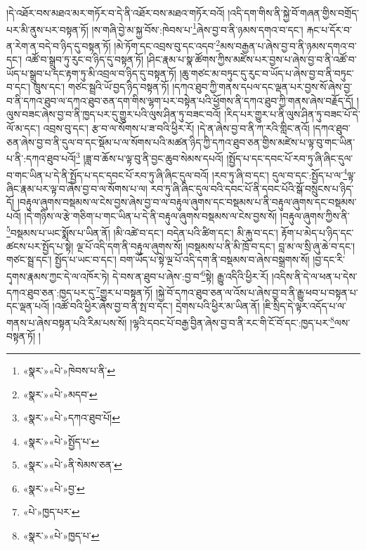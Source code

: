 །དེ་འཐོར་བས་མཐའ་མར་གཏོར་བ་དེ་ནི་འཐོར་བས་མཐའ་གཏོར་བའོ། །འདི་དག་གིས་ནི་སྐྱེ་བོ་གཞན་གྱིས་བགྲོད་པར་མི་ནུས་པར་བསྟན་ཏོ། །ས་གཞི་བྱེ་མ་སྐྱ་བོས་:ཁེབས་པ་\footnote{«སྣར་»«པེ་»ཁེབས་པ་ནི་}ཞེས་བྱ་བ་ནི་ཉམས་དགའ་བ་དང་། རྐང་པ་དོར་བ་ན་རེག་ན་བདེ་བ་ཉིད་དུ་བསྟན་ཏོ། །མེ་ཏོག་དང་འབྲས་བུ་དང་འདབ་\footnote{«སྣར་»«པེ་»མདབ་}མས་བརྒྱན་པ་ཞེས་བྱ་བ་ནི་ཉམས་དགའ་བ་དང་། འཚོ་བ་སྒྲུབ་ཏུ་རུང་བ་ཉིད་དུ་བསྟན་ཏོ། །ཤིང་རྣམ་པ་སྣ་ཚོགས་ཀྱིས་མཛེས་པར་བྱས་པ་ཞེས་བྱ་བ་ནི་འཚོ་བ་ཡོད་པ་སྒྲུབ་པ་དང་རྟག་ཏུ་མི་འབྲལ་བ་ཉིད་དུ་བསྟན་ཏོ། །ཆུ་གཙང་མ་བཏུང་དུ་རུང་བ་ཡོད་པ་ཞེས་བྱ་བ་ནི་བཏུང་བ་དང་། ཁྲུས་དང་། གཙང་སྦྲའི་ཡོ་བྱད་ཉིད་བསྟན་ཏོ། །དཀའ་ཐུབ་ཀྱི་གནས་དཔལ་དང་ལྡན་པར་བྱས་སོ་ཞེས་བྱ་བ་ནི་དཀའ་ཐུབ་ལ་དཀའ་ཐུབ་ཅན་དག་གིས་ལྷག་པར་བསྟེན་པའི་ཕྱོགས་ནི་དཀའ་ཐུབ་ཀྱི་གནས་ཞེས་བརྗོད་དོ། །ལུས་བཟང་ཞེས་བྱ་བ་ནི་ཁྱད་པར་དུ་གྱུར་པའི་ལུས་ཤིན་ཏུ་བཟང་བའོ། །རིད་པར་གྱུར་པ་ནི་ལུས་ཤིན་ཏུ་བཟང་པོ་དེ་ལོ་མ་དང་། འབྲས་བུ་དང་། རྩ་བ་ལ་སོགས་པ་ཟ་བའི་ཕྱིར་རོ། །དེ་ན་ཞེས་བྱ་བ་ནི་ཀ་རའི་གླིང་ནའོ། །དཀའ་ཐུབ་ཅན་ཞེས་བྱ་བ་ནི་དུལ་བ་དང་སྡོམ་པ་ལ་སོགས་པའི་མཚན་ཉིད་ཀྱི་དཀའ་ཐུབ་ཅན་གྱིས་མཛེས་པ་ལྟ་བུ་གང་ཡིན་པ་ནི་:དཀའ་ཐུབ་པའོ།\footnote{«སྣར་»«པེ་»དཀའ་ཐུབ་པོ།} །ཟླ་བ་ཆོས་པ་ལྟ་བུ་ནི་བྱང་ཆུབ་སེམས་དཔའོ། །སྤྱོད་པ་དང་དབང་པོ་རབ་ཏུ་ཞི་ཞིང་དུལ་བ་གང་ཡིན་པ་དེ་ནི་སྤྱོད་པ་དང་དབང་པོ་རབ་ཏུ་ཞི་ཞིང་དུལ་བའོ། །རབ་ཏུ་ཞི་བ་དང་། དུལ་བ་དང་:སྤྱོད་པ་ལ་\footnote{«སྣར་»«པེ་»སྤྱོད་པ་}ལྟ་ཞིང་རྣམ་པར་ལྟ་བ་ཞེས་བྱ་བ་ལ་སོགས་པ་ལ། རབ་ཏུ་ཞི་ཞིང་དུལ་བའི་དབང་པོ་ནི་དབང་པོའི་སྒོ་བསྲུངས་པ་ཉིད་དོ། །བརྟུལ་ཞུགས་བསྡམས་ལ་ངེས་བྱས་ཞེས་བྱ་བ་ལ་བརྟུལ་ཞུགས་དང་བསྡམས་པ་ནི་བརྟུལ་ཞུགས་དང་བསྡམས་པའོ། །དེ་གཉིས་ལ་རྩེ་གཅིག་པ་གང་ཡིན་པ་དེ་ནི་བརྟུལ་ཞུགས་བསྡམས་ལ་ངེས་བྱས་སོ། །བརྟུལ་ཞུགས་ཀྱིས་ནི་\footnote{«སྣར་»«པེ་»ནི་སེམས་ཅན་}བསྡམས་པ་ཡང་སྨོས་པ་ཡིན་ནོ། །མི་འཚེ་བ་དང་། བདེན་པའི་ཚིག་དང་། མི་རྐུ་བ་དང་། རྟོག་པ་མེད་པ་ཉིད་དང་ཚངས་པར་སྤྱོད་པ་སྟེ། ལྔ་པོ་འདི་དག་ནི་བརྟུལ་ཞུགས་སོ། །བསྡམས་པ་ནི་མི་ཁྲོ་བ་དང་། བླ་མ་ལ་སྲི་ཞུ་ཆེ་བ་དང་། གཙང་སྦྲ་དང་། སྤྱོད་པ་ཡང་བ་དང་། བག་ཡོད་པ་སྟེ་ལྔ་པོ་འདི་དག་ནི་བསྡམས་བ་ཞེས་བསྒྲགས་སོ། །བྱ་དང་རི་དྭགས་རྣམས་ཀྱང་དེ་ལ་འཁོར་ཏེ། དེ་བས་ན་ཐུབ་པ་ཞེས་:བྱ་བ་\footnote{«སྣར་»«པེ་»བྱ་}སྟེ། རྒྱུ་འདིའི་ཕྱིར་རོ། །འདིས་ནི་དེ་ལ་ཕན་པ་དེས་དཀའ་ཐུབ་ཅན་:ཁྱད་པར་དུ་\footnote{«པེ་»ཁྱད་པར་}གྱུར་པ་བསྟན་ཏོ། །སྐྱེ་བོ་དཀའ་ཐུབ་ཅན་ལ་འོས་པ་ཞེས་བྱ་བ་ནི་རྒྱུ་ཕབ་པ་བསྟན་པ་དང་ལྡན་པའོ། །འཚོ་བའི་ཕྱིར་ཞེས་བྱ་བ་ནི་སྤ་བ་དང་། དྲེགས་པའི་ཕྱིར་མ་ཡིན་ནོ། །ཇི་སྲིད་དེ་ལྟར་འདོད་པ་ལ་གནས་པ་ཞེས་བསྟན་པའི་རིམ་པས་སོ། །ལྷའི་དབང་པོ་བརྒྱ་བྱིན་ཞེས་བྱ་བ་ནི་རང་གི་ངོ་བོ་དང་:ཁྱད་པར་\footnote{«སྣར་»«པེ་»ཁྱད་པ་}ལས་བསྟན་ཏོ། །
